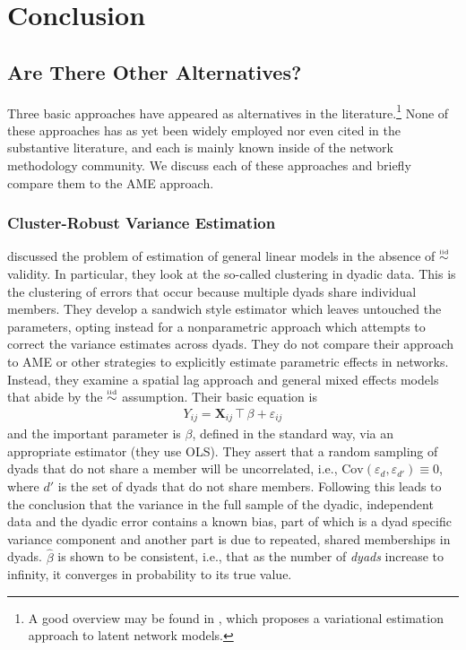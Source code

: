 \section{\textbf{Conclusion}}

\subsection*{Are There Other Alternatives?}

Three basic approaches have appeared as alternatives in the literature.\footnote{A good overview may be found in \cite{stewart:2014}, which proposes a variational estimation approach to latent network models.}
None of these approaches has as yet been widely employed nor even cited in the substantive literature, and each is mainly known inside of the network methodology community.  We discuss each of these approaches and briefly compare them to the AME approach. 


\subsubsection*{Cluster-Robust Variance Estimation}

\cite{aronow:etal:2015} discussed the problem of estimation of general linear models in the absence of $\simiid$ validity. In particular, they look at the so-called clustering in dyadic data. This is the clustering of errors that occur because multiple dyads share individual members. They develop a sandwich style estimator which leaves untouched the parameters, opting instead for a nonparametric approach which attempts to correct the variance estimates across dyads.  They do not compare their approach to AME or other strategies to explicitly estimate parametric effects in networks. Instead, they examine a spatial lag approach and general mixed effects models that abide by the $\simiid$ assumption.  Their basic equation is 
\begin{eqnarray*}
Y_{ij} = \mathbf{X}_{ij}\intercal \beta + \varepsilon_{ij}
\end{eqnarray*}
and the important parameter is $\beta$, defined in the standard way, via an appropriate estimator (they use OLS).  They assert that a random sampling of dyads that do not share a member will be uncorrelated, i.e., $\text{Cov}(\varepsilon_d,\varepsilon_{d'}) \equiv 0$, where $d'$ is the set of dyads that do not share members. Following this leads to the conclusion that the variance in the full sample of the dyadic, independent data and the dyadic error contains a known bias, part of which is a dyad specific variance component and another part is due to repeated, shared memberships in dyads. $\hat{\beta}$ is shown to be consistent, i.e., that as the number of \emph{dyads} increase to infinity, it converges in probability to its true value. 

